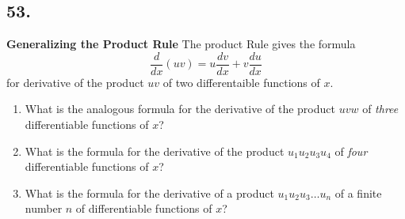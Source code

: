 \documentclass{article}
\begin{document}
\subsection*{53.}
\textbf{Generalizing the Product Rule}  The product Rule gives the formula
\[\frac{d}{dx}(uv)=u\frac{dv}{dx}+v\frac{du}{dx}\]
for derivative of the product $uv$ of two differentaible functions of $x$.
\begin{enumerate} [label=\textbf{\alph*.}]
    \item What is the analogous formula for the derivative of the product $uvw$ of \textit{three} differentiable functions of $x$?
    \item What is the formula for the derivative of the product $u_1u_2u_3u_4$ of \textit{four} differentiable functions of $x$?
    \item What is the formula for the derivative of a product $u_1u_2u_3\dots u_n$ of a finite number $n$ of differentiable functions of $x$?
\end{enumerate}
\end{document}
